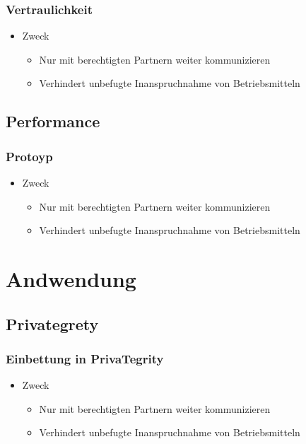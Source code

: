 \documentclass[t, xcolor=dvipsnames]{beamer}
\begin{document}
\begin{frame}
	\frametitle{Vertraulichkeit}
	\begin{itemize}
		\item Zweck
			\begin{itemize}
				\item Nur mit \alert{berechtigten Partnern} weiter kommunizieren
				\item Verhindert unbefugte Inanspruchnahme von Betriebsmitteln
			\end{itemize}
	\end{itemize}
	\vspace{\fill}
\end{frame}
\subsection{Performance}
\begin{frame}
	\frametitle{Protoyp}
	\begin{itemize}
		\item Zweck
			\begin{itemize}
				\item Nur mit \alert{berechtigten Partnern} weiter kommunizieren
				\item Verhindert unbefugte Inanspruchnahme von Betriebsmitteln
			\end{itemize}
	\end{itemize}
	\vspace{\fill}
\end{frame}
\section{Andwendung}
\subsection{Privategrety}
\begin{frame}
	\frametitle{Einbettung in PrivaTegrity}
	\begin{itemize}
		\item Zweck
			\begin{itemize}
				\item Nur mit \alert{berechtigten Partnern} weiter kommunizieren
				\item Verhindert unbefugte Inanspruchnahme von Betriebsmitteln
			\end{itemize}
	\end{itemize}
	\vspace{\fill}
\end{frame}
\end{document}
